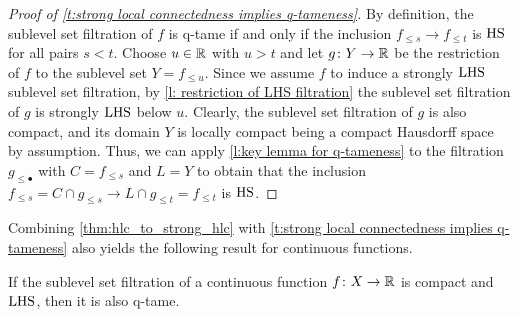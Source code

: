 \begin{proof}[Proof of \cref{t:strong local connectedness implies q-tameness}]
    By definition, the sublevel set filtration of $f$ is q-tame if and only if the inclusion $f_{\leq s} \to f_{\leq t}$ is $\mathrm{HS}$ for all pairs $s < t$. 
    Choose $u \in \mathbb{R}$ with $u > t$ and let $g \colon Y \to \mathbb{R}$ be the restriction of $f$ to the sublevel set $Y=f_{\leq u}$. 
    Since we assume $f$ to induce a strongly $\mathrm{LHS}$ sublevel set filtration, by \cref{l: restriction of LHS filtration} the sublevel set filtration of $g$ is strongly $\mathrm{LHS}$ below $u$. 
    Clearly, the sublevel set filtration of $g$ is also compact, and its domain $Y$ is locally compact being a compact Hausdorff space by assumption.
    Thus, we can apply \cref{l:key lemma for q-tameness} to the filtration $g_{\leq \bullet}$ with $C = f_{\leq s}$ and $L = Y$ to obtain that the inclusion $f_{\leq s} = C \cap g_{\leq s} \to L \cap g_{\leq t} = f_{\leq t}$ is $\mathrm{HS}$.
\end{proof}

Combining \cref{thm:hlc_to_strong_hlc} with \cref{t:strong local connectedness implies q-tameness} also yields the following result for continuous functions.

\begin{cor}\label{c: q-tameness for continuous functions}
    If the sublevel set filtration of a continuous function $f \colon X \to \mathbb{R}$ is compact and $\mathrm{LHS}$, then it is also q-tame.
\end{cor}


